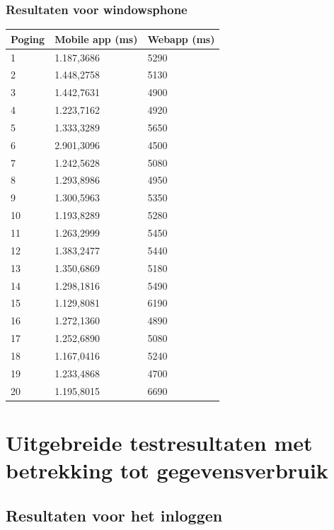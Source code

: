 \documentclass[pdftex,a4paper,12pt,twoside]{report}
\begin{document}
\subsection{Resultaten voor windowsphone}
\begin{center}
  \begin{tabular}{ | l | l | l |}
      \hline
      Poging & Mobile app (ms) & Webapp (ms)
      \\ \hline
      1 & 1.187,3686 & 5290
      \\ \hline
      2 & 1.448,2758 & 5130
      \\ \hline
      3 & 1.442,7631 & 4900
      \\ \hline
      4 & 1.223,7162 & 4920
      \\ \hline
      5 & 1.333,3289 & 5650
      \\ \hline
      6 & 2.901,3096 & 4500
      \\ \hline
      7 & 1.242,5628 & 5080
      \\ \hline
      8 & 1.293,8986 & 4950
      \\ \hline
      9 & 1.300,5963 & 5350
      \\ \hline
      10 & 1.193,8289 & 5280
      \\ \hline
      11 & 1.263,2999 & 5450
      \\ \hline
      12 & 1.383,2477 & 5440
      \\ \hline
      13 & 1.350,6869 & 5180
      \\ \hline
      14 & 1.298,1816 & 5490
      \\ \hline
      15 & 1.129,8081 & 6190
      \\ \hline
      16 & 1.272,1360 & 4890
      \\ \hline
      17 & 1.252,6890 & 5080
      \\ \hline
      18 & 1.167,0416 & 5240
      \\ \hline
      19 & 1.233,4868 & 4700
      \\ \hline
      20 & 1.195,8015 & 6690
      \\ \hline
   \end{tabular}
\end{center}

\chapter{Uitgebreide testresultaten met betrekking tot gegevensverbruik}
\section{Resultaten voor het inloggen}
\end{document}
